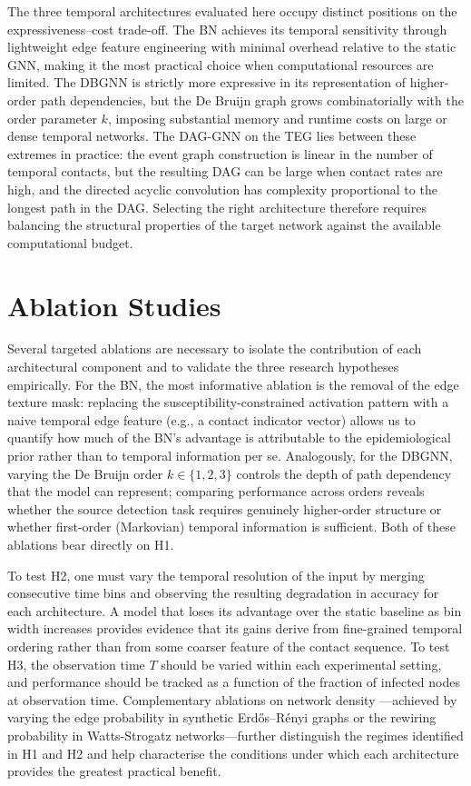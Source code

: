 The three temporal architectures evaluated here occupy distinct positions on the
expressiveness--cost trade-off. The BN achieves its temporal sensitivity through
lightweight edge feature engineering with minimal overhead relative to the
static GNN, making it the most practical choice when computational resources
are limited. The DBGNN is strictly more expressive in its representation of
higher-order path dependencies, but the De Bruijn graph grows combinatorially
with the order parameter $k$, imposing substantial memory and runtime costs on
large or dense temporal networks. The DAG-GNN on the TEG lies between these
extremes in practice: the event graph construction is linear in the number of
temporal contacts, but the resulting DAG can be large when contact rates are
high, and the directed acyclic convolution has complexity proportional to the
longest path in the DAG. Selecting the right architecture therefore requires
balancing the structural properties of the target network against the available
computational budget.

\section{Ablation Studies}
\label{st:ablation}

Several targeted ablations are necessary to isolate the contribution of each
architectural component and to validate the three research hypotheses
empirically. For the BN, the most informative ablation is the removal of the
edge texture mask: replacing the susceptibility-constrained activation pattern
with a naive temporal edge feature (e.g., a contact indicator vector) allows
us to quantify how much of the BN's advantage is attributable to the
epidemiological prior rather than to temporal information per se. Analogously,
for the DBGNN, varying the De Bruijn order $k \in \{1, 2, 3\}$ controls the
depth of path dependency that the model can represent; comparing performance
across orders reveals whether the source detection task requires genuinely
higher-order structure or whether first-order (Markovian) temporal information
is sufficient. Both of these ablations bear directly on H1.

To test H2, one must vary the temporal resolution of the input by merging
consecutive time bins and observing the resulting degradation in accuracy for
each architecture. A model that loses its advantage over the static baseline
as bin width increases provides evidence that its gains derive from fine-grained
temporal ordering rather than from some coarser feature of the contact sequence.
To test H3, the observation time $T$ should be varied within each experimental
setting, and performance should be tracked as a function of the fraction of
infected nodes at observation time. Complementary ablations on network density
---achieved by varying the edge probability in synthetic Erd\H{o}s--R\'enyi
graphs or the rewiring probability in Watts-Strogatz networks---further
distinguish the regimes identified in H1 and H2 and help characterise the
conditions under which each architecture provides the greatest practical
benefit.
